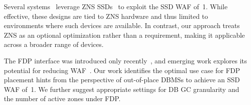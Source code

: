 Several systems~\cite{ssdfs, zenfs, DBLP:conf/usenix/Hwang0KES25, yang2024zonedstorageoptimizedflash, DBLP:conf/hotstorage/LeeLL022, DBLP:journals/fgcs/HaS25} 
leverage ZNS SSDs~\cite{DBLP:conf/usenix/BjorlingAHRMGA21} to exploit the SSD WAF of~1.
While effective, these designs are tied to ZNS hardware and thus limited to environments where such devices are available.
In contrast, our approach treats ZNS as an optional optimization rather than a requirement, making it applicable across a broader range of devices.

The FDP interface was introduced only recently~\cite{nvme_fdp_tp4146}, and emerging work explores its potential for reducing WAF~\cite{DBLP:conf/hotstorage/ZhangPCK23,eurosys25,george2024fdp}.
Our work identifies the optimal use case for FDP placement hints from the perspective of out-of-place DBMSs to achieve an SSD WAF of~1.
We further suggest appropriate settings for DB GC granularity and the number of active zones under FDP.

